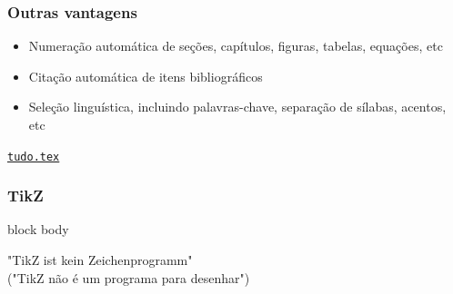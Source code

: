 \documentclass{beamer}
\newcommand{\kw}[1]{\textbackslash {\color{europeanalonis}#1}}
\begin{document}
\begin{frame}
   \frametitle{Outras vantagens}
   \begin{itemize}
      \item Numeração automática de seções, capítulos, figuras, tabelas, equações, etc
      \item<2-> Citação automática de itens bibliográficos
      \item<3-> Seleção linguística, incluindo palavras-chave, separação de sílabas, acentos, etc
   \end{itemize}
   \begin{center}
      \href{exemplos_latex/tudo.tex}{\tt{tudo.tex}}
   \end{center}
\end{frame}
\begin{frame}
  \frametitle{TikZ}
  \begin{center}
    \begin{minipage}{8cm}
      \begin{beamercolorbox}[sep=1em,wd=8cm]{block body}
        \begin{center}
          "TikZ ist kein Zeichenprogramm" \\("TikZ não é um programa para desenhar")
        \end{center}
      \end{beamercolorbox}
      \end{minipage}
   \end{center}
\end{frame}
\end{document}
